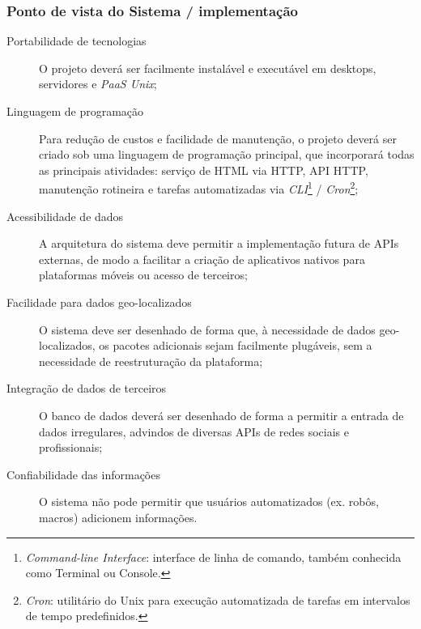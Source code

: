 \documentclass[12pt,a4paper,twoside,hyphens,english,brazil]{abntex2}
\begin{document}
\subsubsection*{Ponto de vista do Sistema / implementação}
\begin{description}
	\item[Portabilidade de tecnologias]
		O projeto deverá ser facilmente instalável e executável em desktops, servidores e \emph{PaaS Unix};
	\item[Linguagem de programação]
		Para redução de custos e facilidade de manutenção, o projeto deverá ser criado sob uma linguagem de programação principal, que incorporará todas as principais atividades: serviço de HTML via HTTP, API HTTP, manutenção rotineira e tarefas automatizadas via \emph{CLI}\footnote{\emph{Command-line Interface}: interface de linha de comando, também conhecida como Terminal ou Console.} / \emph{Cron}\footnote{\emph{Cron}: utilitário do Unix para execução automatizada de tarefas em intervalos de tempo predefinidos.};
	\item[Acessibilidade de dados]
		A arquitetura do sistema deve permitir a implementação futura de APIs externas, de modo a facilitar a criação de aplicativos nativos para plataformas móveis ou acesso de terceiros;
	\item[Facilidade para dados geo-localizados]
		O sistema deve ser desenhado de forma que, à necessidade de dados geo-localizados, os pacotes adicionais sejam facilmente plugáveis, sem a necessidade de reestruturação da plataforma;
	\item[Integração de dados de terceiros]
		O banco de dados deverá ser desenhado de forma a permitir a entrada de dados irregulares, advindos de diversas APIs de redes sociais e profissionais;
	\item[Confiabilidade das informações]
		O sistema não pode permitir que usuários automatizados (ex. robôs, macros) adicionem informações.
\end{description}
\end{document}
